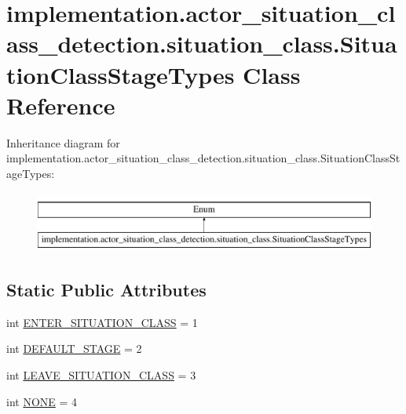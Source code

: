 \hypertarget{classimplementation_1_1actor__situation__class__detection_1_1situation__class_1_1_situation_class_stage_types}{}\section{implementation.\+actor\+\_\+situation\+\_\+class\+\_\+detection.\+situation\+\_\+class.\+Situation\+Class\+Stage\+Types Class Reference}
\label{classimplementation_1_1actor__situation__class__detection_1_1situation__class_1_1_situation_class_stage_types}
Inheritance diagram for implementation.\+actor\+\_\+situation\+\_\+class\+\_\+detection.\+situation\+\_\+class.\+Situation\+Class\+Stage\+Types\+:\begin{figure}[H]
\begin{center}
\leavevmode
\includegraphics[height=2.000000cm]{classimplementation_1_1actor__situation__class__detection_1_1situation__class_1_1_situation_class_stage_types}
\end{center}
\end{figure}
\subsection*{Static Public Attributes}
\begin{DoxyCompactItemize}
\item 
int \hyperlink{classimplementation_1_1actor__situation__class__detection_1_1situation__class_1_1_situation_class_stage_types_a66dc0c8e325fc64191fa40103932e0c4}{E\+N\+T\+E\+R\+\_\+\+S\+I\+T\+U\+A\+T\+I\+O\+N\+\_\+\+C\+L\+A\+SS} = 1
\item 
int \hyperlink{classimplementation_1_1actor__situation__class__detection_1_1situation__class_1_1_situation_class_stage_types_a610c5162811196c8b8edab00507efe92}{D\+E\+F\+A\+U\+L\+T\+\_\+\+S\+T\+A\+GE} = 2
\item 
int \hyperlink{classimplementation_1_1actor__situation__class__detection_1_1situation__class_1_1_situation_class_stage_types_aa72493675b58b32a7803b85abd50d57c}{L\+E\+A\+V\+E\+\_\+\+S\+I\+T\+U\+A\+T\+I\+O\+N\+\_\+\+C\+L\+A\+SS} = 3
\item 
int \hyperlink{classimplementation_1_1actor__situation__class__detection_1_1situation__class_1_1_situation_class_stage_types_afe10604ad2d9f28a934e625a24fb707d}{N\+O\+NE} = 4
\end{DoxyCompactItemize}


